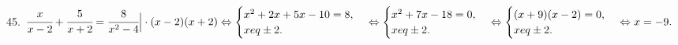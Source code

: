 45. $\cfrac{x}{x-2}+\cfrac{5}{x+2}=\cfrac{8}{x^2-4}\Big|\cdot(x-2)(x+2)\Leftrightarrow\begin{cases}x^2+2x+5x-10=8,\\x
eq\pm2.\end{cases}
\Leftrightarrow\begin{cases}x^2+7x-18=0,\\x
eq\pm2.\end{cases}\Leftrightarrow\begin{cases}(x+9)(x-2)=0,\\x
eq\pm2.\end{cases}\Leftrightarrow x=-9.$\\
